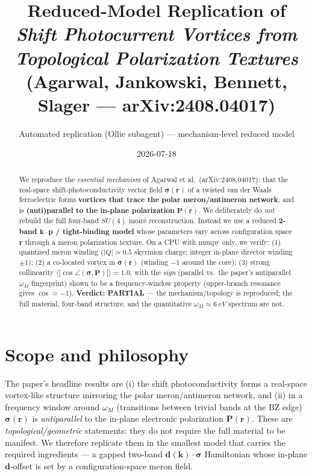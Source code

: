 \documentclass[11pt]{article}
\title{Reduced-Model Replication of \\ \emph{Shift Photocurrent Vortices from Topological Polarization Textures} \\ \normalsize (Agarwal, Jankowski, Bennett, Slager --- arXiv:2408.04017)}
\author{Automated replication (Ollie subagent) --- mechanism-level reduced model}
\date{2026-07-18}
\begin{document}
\maketitle

\begin{abstract}
We reproduce the \emph{essential mechanism} of Agarwal et al.\ (arXiv:2408.04017):
that the real-space shift-photoconductivity vector field $\boldsymbol{\sigma}(\mathbf r)$ of a
twisted van der Waals ferroelectric forms \textbf{vortices that trace the polar
meron/antimeron network}, and is \textbf{(anti)parallel to the in-plane polarization}
$\mathbf P(\mathbf r)$. We deliberately do \emph{not} rebuild the full four-band $SU(4)$ moir\'e
reconstruction. Instead we use a reduced \textbf{2-band $\mathbf{k\cdot p}$ / tight-binding model}
whose parameters vary across configuration space $\mathbf r$ through a meron polarization
texture. On a CPU with numpy only, we verify: (1) quantized meron winding
($|Q|\simeq 0.5$ skyrmion charge; integer in-plane director winding $\pm1$);
(2) a co-located vortex in $\boldsymbol\sigma(\mathbf r)$ (winding $-1$ around the core);
(3) strong collinearity $\langle|\cos\angle(\boldsymbol\sigma,\mathbf P)|\rangle = 1.0$, with the
\emph{sign} (parallel vs.\ the paper's antiparallel $\omega_M$ fingerprint) shown to be a
frequency-window property (upper-branch resonance gives $\cos=-1$). \textbf{Verdict: PARTIAL}
--- the mechanism/topology is reproduced; the full material, four-band structure, and the
quantitative $\omega_M\approx\SI{6}{eV}$ spectrum are not.
\end{abstract}

\section{Scope and philosophy}
The paper's headline results are (i) the shift photoconductivity forms a real-space
vortex-like structure mirroring the polar meron/antimeron network, and (ii) in a
frequency window around $\omega_M$ (transitions between trivial bands at the BZ edge)
$\boldsymbol\sigma(\mathbf r)$ is \emph{antiparallel} to the in-plane electronic polarization
$\mathbf P(\mathbf r)$. These are \emph{topological/geometric} statements: they do not require
the full material to be manifest. We therefore replicate them in the smallest model that
carries the required ingredients --- a gapped two-band $\mathbf d(\mathbf k)\cdot\boldsymbol\sigma$
Hamiltonian whose in-plane $\mathbf d$-offset is set by a configuration-space meron field.
\end{document}
